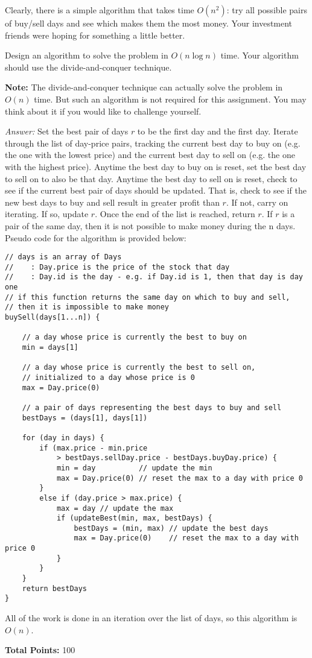 \documentclass[11pt]{article}
\begin{document}
\begin{enumerate}
Clearly, there is a simple algorithm that takes time $O(n^2)$: try all possible pairs of buy/sell days and see which makes them the most money. Your investment friends were hoping for something a little better.

Design an algorithm to solve the problem in $O(n\log n)$ time. Your algorithm should use the divide-and-conquer technique.


{\bf Note:} The divide-and-conquer technique can actually solve the problem in $O(n)$ time. But such an algorithm is not required for this assignment. You may think about it if you would like to challenge yourself.

\textit{Answer:} Set the best pair of days $r$ to be the first day and the first day. Iterate through the list of day-price pairs,
tracking the current best day to buy on (e.g. the one with the lowest price) and the current best day to sell on 
(e.g. the one with the highest price). Anytime the best day to buy on is reset, set the best day to sell on to also be that day.
Anytime the best day to sell on is reset, check to see if the current best pair of days should be updated. That is, check to see if the
new best days to buy and sell result in greater profit than $r$. If not, carry on iterating. If so, update $r$.
Once the end of the list is reached, return $r$. If $r$ is a pair of the same day, then it is not possible to make money during the 
n days. Pseudo code for the algorithm is provided below:
\begin{verbatim}
// days is an array of Days
//    : Day.price is the price of the stock that day
//    : Day.id is the day - e.g. if Day.id is 1, then that day is day one
// if this function returns the same day on which to buy and sell, 
// then it is impossible to make money
buySell(days[1...n]) {

    // a day whose price is currently the best to buy on
    min = days[1]

    // a day whose price is currently the best to sell on, 
   	// initialized to a day whose price is 0
    max = Day.price(0)

    // a pair of days representing the best days to buy and sell
    bestDays = (days[1], days[1])

    for (day in days) {
        if (max.price - min.price 
            > bestDays.sellDay.price - bestDays.buyDay.price) {
            min = day          // update the min
            max = Day.price(0) // reset the max to a day with price 0
        }
        else if (day.price > max.price) {
            max = day // update the max
            if (updateBest(min, max, bestDays) {
                bestDays = (min, max) // update the best days
                max = Day.price(0)    // reset the max to a day with price 0
            }
        }
    }
    return bestDays
}
\end{verbatim}
All of the work is done in an iteration over the list of days, so this algorithm is $O(n)$.
\end{enumerate}

{\bf Total Points:} 100
\end{document}
